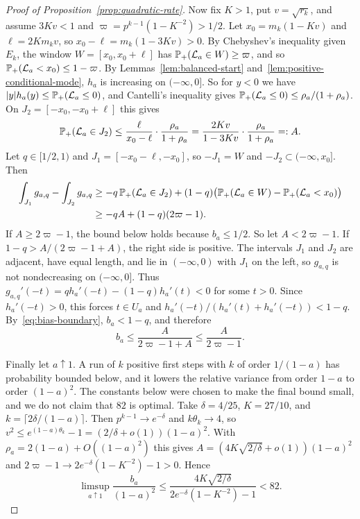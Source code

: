 \begin{proof}[Proof of Proposition~\ref{prop:quadratic-rate}]
Now fix $K>1$, put $v=\sqrt{r_k}$, and assume $3Kv<1$ and
$\varpi=p^{k-1}(1-K^{-2})>1/2$. Let $x_0=m_k(1-Kv)$ and $\ell=2Km_kv$, so
$x_0-\ell=m_k(1-3Kv)>0$. By Chebyshev's inequality given $E_k$, the
window $W=[x_0,x_0+\ell]$ has $\mathbb{P}_+(\mathcal L_a\in W)\ge\varpi$, and
so $\mathbb{P}_+(\mathcal L_a<x_0)\le1-\varpi$. By
Lemmas~\ref{lem:balanced-start} and~\ref{lem:positive-conditional-mode},
$h_a$ is increasing on $(-\infty,0]$. So for $y<0$ we have
$|y|h_a(y)\le\mathbb{P}_+(\mathcal L_a\le0)$, and Cantelli's inequality
gives $\mathbb{P}_+(\mathcal L_a\le0)\le\rho_a/(1+\rho_a)$. On
$J_2=[-x_0,-x_0+\ell]$ this gives
\[
 \mathbb{P}_+(\mathcal L_a\in J_2)\le\frac{\ell}{x_0-\ell}\cdot
 \frac{\rho_a}{1+\rho_a}
 =\frac{2Kv}{1-3Kv}\cdot\frac{\rho_a}{1+\rho_a}=:A.
\]
Let $q\in[1/2,1)$ and $J_1=[-x_0-\ell,-x_0]$, so $-J_1=W$ and
$-J_2\subset(-\infty,x_0]$. Then
\begin{align*}
 \int_{J_1}g_{a,q}-\int_{J_2}g_{a,q}
 &\ge-q\,\mathbb{P}_+(\mathcal L_a\in J_2)
   +(1-q)\bigl(\mathbb{P}_+(\mathcal L_a\in W)-\mathbb{P}_+(\mathcal L_a<x_0)\bigr)\\
 &\ge-qA+(1-q)(2\varpi-1).
\end{align*}
If $A\ge2\varpi-1$, the bound below holds because $b_a\le1/2$. So let
$A<2\varpi-1$. If $1-q>A/(2\varpi-1+A)$, the right side is positive. The intervals $J_1$
and $J_2$ are adjacent, have equal length, and lie in $(-\infty,0)$
with $J_1$ on the left, so $g_{a,q}$ is not nondecreasing on
$(-\infty,0]$. Thus $g_{a,q}'(-t)=qh_a'(-t)-(1-q)h_a'(t)<0$ for some
$t>0$. Since $h_a'(-t)>0$, this forces $t\in U_a$ and
$h_a'(-t)/(h_a'(t)+h_a'(-t))<1-q$. By~\eqref{eq:bias-boundary},
$b_a<1-q$, and therefore
\[
 b_a\le\frac{A}{2\varpi-1+A}\le\frac A{2\varpi-1}.
\]

Finally let $a\uparrow1$. A run of $k$ positive first steps with
$k$ of order $1/(1-a)$ has probability bounded below, and it lowers
the relative variance from order $1-a$ to order $(1-a)^2$. The
constants below were chosen to make the final bound small, and we do
not claim that $82$ is optimal. Take $\delta=4/25$, $K=27/10$, and
$k=\lceil2\delta/(1-a)\rceil$. Then $p^{k-1}\to e^{-\delta}$ and
$k\theta_k\to4$, so $v^2\le e^{(1-a)\theta_k}-1=(2/\delta+o(1))(1-a)^2$.
With $\rho_a=2(1-a)+O((1-a)^2)$ this gives
$A=(4K\sqrt{2/\delta}+o(1))(1-a)^2$ and
$2\varpi-1\to2e^{-\delta}(1-K^{-2})-1>0$. Hence
\[
 \limsup_{a\uparrow1}\frac{b_a}{(1-a)^2}
 \le\frac{4K\sqrt{2/\delta}}{2e^{-\delta}(1-K^{-2})-1}<82.
\]
\end{proof}
